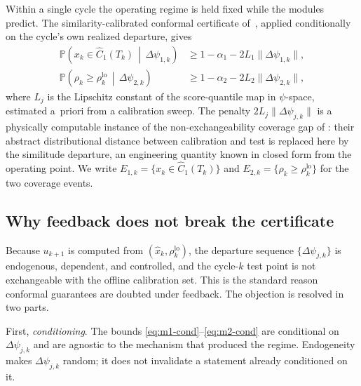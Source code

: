 \documentclass[review,12pt]{elsarticle}
\theoremstyle{definition}
\begin{document}
Within a single cycle the operating regime is held fixed while the modules
predict. The similarity-calibrated conformal certificate of~\citet{busico_m3},
applied conditionally on the cycle's own realized departure, gives
\begin{align}
\mathbb{P}\!\left(x_k \in \hat C_1(T_k) \,\middle|\, \Delta\psi_{1,k}\right)
  &\ge 1-\alpha_1 - 2L_1\|\Delta\psi_{1,k}\|, \label{eq:m1-cond}\\
\mathbb{P}\!\left(\rho_k \ge \rho_k^{\mathrm{lo}} \,\middle|\, \Delta\psi_{2,k}\right)
  &\ge 1-\alpha_2 - 2L_2\|\Delta\psi_{2,k}\|, \label{eq:m2-cond}
\end{align}
where $L_j$ is the Lipschitz constant of the score-quantile map in $\psi$-space,
estimated a~priori from a calibration sweep. The penalty $2L_j\|\Delta\psi_{j,k}\|$
is a physically computable instance of the non-exchangeability coverage gap of
\citet{barber2023}: their abstract distributional distance between calibration and
test is replaced here by the similitude departure, an engineering quantity known
in closed form from the operating point. We write
$E_{1,k} = \{x_k \in \hat C_1(T_k)\}$ and
$E_{2,k} = \{\rho_k \ge \rho_k^{\mathrm{lo}}\}$ for the two coverage events.

\subsection{Why feedback does not break the certificate}
\label{sec:causal}

Because $u_{k+1}$ is computed from $(\hat x_k, \rho_k^{\mathrm{lo}})$, the departure
sequence $\{\Delta\psi_{j,k}\}$ is endogenous, dependent, and controlled, and the
cycle-$k$ test point is not exchangeable with the offline calibration set. This is
the standard reason conformal guarantees are doubted under feedback. The objection
is resolved in two parts.

First, \emph{conditioning}. The bounds \eqref{eq:m1-cond}--\eqref{eq:m2-cond} are
conditional on $\Delta\psi_{j,k}$ and are agnostic to the mechanism that produced
the regime. Endogeneity makes $\Delta\psi_{j,k}$ random; it does not invalidate a
statement already conditioned on it.
\end{document}
